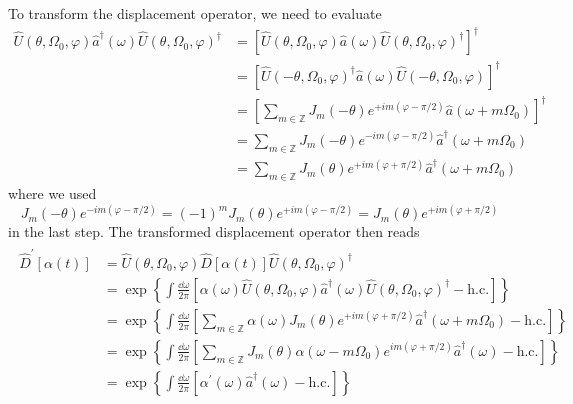 To transform the displacement operator, we need to evaluate
\begin{equation}
	\begin{split}
		\hat{U}(\theta,\Omega_0,\varphi)
		\hat{a}^\dagger(\omega)
		\hat{U}(\theta,\Omega_0,\varphi)^\dagger
		&=
		\left[
			\hat{U}(\theta,\Omega_0,\varphi)
			\hat{a}(\omega)
			\hat{U}(\theta,\Omega_0,\varphi)^\dagger	
		\right]^\dagger
		\\
		&=
		\left[
			\hat{U}(-\theta,\Omega_0,\varphi)^\dagger
			\hat{a}(\omega)
			\hat{U}(-\theta,\Omega_0,\varphi)
		\right]^\dagger
		\\
		&=
		\left[
			\sum_{m\in\mathbb{Z}}
			J_m(-\theta)
			e^{+im(\varphi-\pi/2)}
			\hat{a}(\omega+m\Omega_0)
		\right]^\dagger
		\\
		&=
		\sum_{m\in\mathbb{Z}}
		J_m(-\theta)
		e^{-im(\varphi-\pi/2)}
		\hat{a}^\dagger(\omega+m\Omega_0)
		\\
		&=
		\sum_{m\in\mathbb{Z}}
		J_m(\theta)
		e^{+im(\varphi+\pi/2)}
		\hat{a}^\dagger(\omega+m\Omega_0)
	\end{split}
\end{equation}
where we used
\begin{equation}
	J_m(-\theta)
	e^{-im(\varphi-\pi/2)}
	=
	(-1)^m
	J_m(\theta)
	e^{+im(\varphi-\pi/2)}
	=
	J_m(\theta)
	e^{+im(\varphi+\pi/2)}
\end{equation}
in the last step.
The transformed displacement operator then reads
\begin{align}
	\begin{split}
		\hat{D}^\prime\left[\alpha(t)\right]
		&=
		\hat{U}(\theta,\Omega_0,\varphi)
		\hat{D}\left[\alpha(t)\right]
		\hat{U}(\theta,\Omega_0,\varphi)^\dagger
		\\
		&=
		\exp\left\{
			\int\frac{\dd{\omega}}{2\pi}
			\left[
				\alpha(\omega)
				\hat{U}(\theta,\Omega_0,\varphi)
				\hat{a}^\dagger(\omega)
				\hat{U}(\theta,\Omega_0,\varphi)^\dagger
				-
				\text{h.c.}
			\right]
		\right\}
		\\
		&=
		\exp\left\{
			\int\frac{\dd{\omega}}{2\pi}
			\left[
				\sum_{m\in\mathbb{Z}}
				\alpha(\omega)
				J_m(\theta)
				e^{+im(\varphi+\pi/2)}
				\hat{a}^\dagger(\omega+m\Omega_0)
				-
				\text{h.c.}
			\right]
		\right\}
		\\
		&=
		\exp\left\{
			\int\frac{\dd{\omega}}{2\pi}
			\left[
				\sum_{m\in\mathbb{Z}}
				J_m(\theta)
				\alpha(\omega-m\Omega_0)
				e^{im(\varphi+\pi/2)}
				\hat{a}^\dagger(\omega)
				-
				\text{h.c.}
			\right]
		\right\}
		\\
		&=
		\exp\left\{
			\int\frac{\dd{\omega}}{2\pi}
			\left[
				\alpha^\prime(\omega)
				\hat{a}^\dagger(\omega)
				-
				\text{h.c.}
			\right]
		\right\}
	\end{split}	
\end{align}
